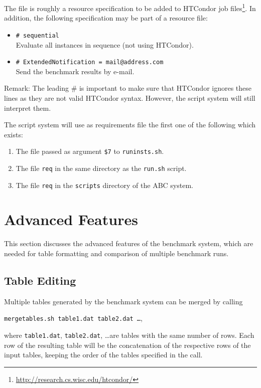 \documentclass[a4paper]{article}
\newcommand{\abcs}{{ABC}}
\begin{document}
			The file is roughly a resource specification to be added to
			HTCondor job files\footnote{\url{http://research.cs.wisc.edu/htcondor/}}.
			In addition, the following specification may be part of a resource file:
			\begin{itemize}
				\item {\tt \# sequential} \\
					Evaluate all instances in sequence (not using HTCondor).
				\item {\tt \# ExtendedNotification = mail@address.com} \\
					 Send the benchmark results by e-mail. 
			\end{itemize}
			Remark: The leading {\#} is important to make sure that HTCondor ignores these lines
			as they are not valid HTCondor syntax. However, the script system will still interpret them.
	
			The script system will use as requirements file the first one of the following which exists:
			\begin{enumerate}
				\item The file passed as argument {\tt \$7} to {\tt runinsts.sh}.
				\item The file {\tt req} in the same directory as the {\tt run.sh} script.
				\item The file {\tt req} in the {\tt scripts} directory of the \abcs{} system.
			\end{enumerate}

	\section{Advanced Features}
	\label{sec:advanced}

		This section discusses the advanced features of the benchmark system,
		which are needed for table formatting and comparison of multiple benchmark runs.

		\subsection{Table Editing}

			Multiple tables generated by the benchmark system can be merged by calling
			\begin{center}
				{\tt mergetables.sh table1.dat table2.dat \ldots},
			\end{center}
			where {\tt table1.dat}, {\tt table2.dat}, \ldots are tables
			with the same number of rows. Each row of the resulting table will be the
			concatenation of the respective rows of the input tables, keeping the order of the tables
			specified in the call.
\end{document}
